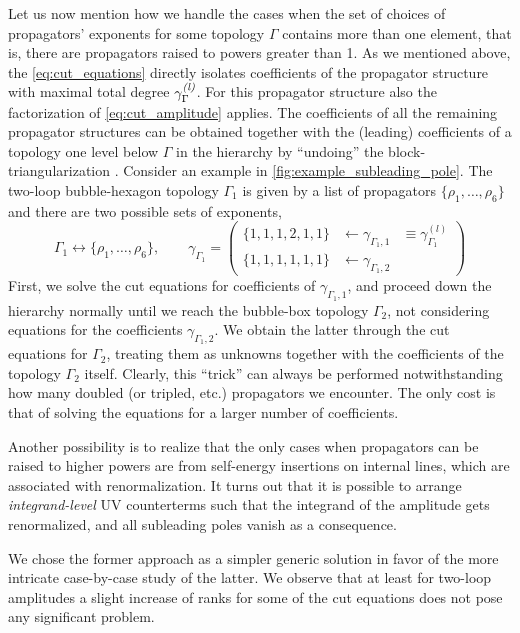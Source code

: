 {Let us now mention how we handle
the cases when the set of choices of propagators' exponents for some topology $\Gamma$
contains more than one element, that is, there are propagators raised to powers greater than 1.
As we mentioned above, the \cref{eq:cut_equations} directly isolates coefficients of 
the propagator structure with maximal total degree ${\gamma^{\textit{(l)}}_{\Gamma}}$. For this propagator structure
also the factorization of \cref{eq:cut_amplitude} applies.
The coefficients of all the remaining propagator structures can be obtained together with the (leading) coefficients  of a topology one level below
$\Gamma$ in the hierarchy by ``undoing'' the block-triangularization \cite{Abreu:2017idw}.
Consider an example in \cref{fig:example_subleading_pole}.
The two-loop bubble-hexagon topology $\Gamma_1$ is given by a list of propagators $\{\rho_1,\ldots{},\rho_6\}$ and there are two
possible sets of exponents,
\[
  \Gamma_1 \leftrightarrow  \{\rho_1,\ldots{},\rho_6\}, \qquad \gamma_{\Gamma_1} =  
  \begin{pmatrix} 
    \{1,1,1,2,1,1\} &\leftarrow \gamma_{{\Gamma_1},1}  & \equiv \gamma_{\Gamma_1}^{(\textit{l})} \\ 
    \{1,1,1,1,1,1\} &\leftarrow \gamma_{{\Gamma_1},2} &
  \end{pmatrix}
\]
First, we solve the cut equations for coefficients of $\gamma_{{\Gamma_1},1}$, and proceed down the hierarchy normally until we reach
the bubble-box topology $\Gamma_2$, not considering equations for the coefficients $\gamma_{{\Gamma_1},2}$.
We obtain the latter through the cut equations for $\Gamma_2$, treating them as unknowns together with 
the coefficients of the topology $\Gamma_2$ itself. Clearly, this ``trick'' can always be performed
notwithstanding how many doubled (or tripled, etc.\@) propagators we encounter.
The only cost is that of solving the equations for a larger number of coefficients.

Another possibility is to realize that the only cases when propagators can be raised to higher powers 
are from self-energy insertions on internal lines, which are associated with renormalization.
It turns out \cite{Baumeister:2019rmh} that
it is possible to arrange \emph{integrand-level} UV counterterms such that
the integrand of the amplitude gets renormalized,
and all subleading poles vanish as a consequence.

We chose the former approach as a simpler generic solution in favor of the
more intricate case-by-case study of the latter.
We observe that at least for two-loop
amplitudes a slight increase of ranks for some of the cut equations does not
pose any significant problem.

}
